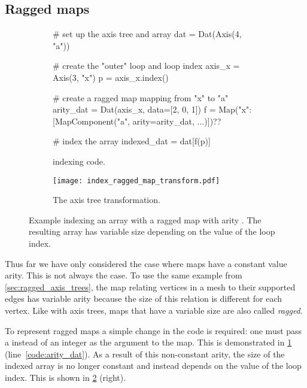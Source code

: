 \documentclass[thesis]{subfiles}
\begin{document}
\subsection{Ragged maps}
\label{sec:indexing_ragged_maps}

\begin{figure}
  \centering

  \begin{subfigure}{.9\textwidth}
    \begin{pyalg2}
      # set up the axis tree and array
      dat = Dat(Axis(4, "a"))

      # create the "outer" loop and loop index
      axis_x = Axis(3, "x")
      p = axis_x.index()

      # create a ragged map mapping from "x" to "a"
      arity_dat = Dat(axis_x, data=[2, 0, 1])
      f = Map({"x": [MapComponent("a", arity=arity_dat, ...)]})?\label{code:arity_dat}?

      # index the array
      indexed_dat = dat[f(p)]
    \end{pyalg2}

    \caption{ indexing code.}
    \label{fig:index_ragged_map_code}
  \end{subfigure}

  \vspace{1em}

  \begin{subfigure}{\textwidth}
    \centering
    \texttt{[image: index\_ragged\_map\_transform.pdf]}
    \caption{The axis tree transformation.}
    \label{fig:index_ragged_map_transform}
  \end{subfigure}

  \caption{
    Example indexing an array with a ragged map with arity \pycode{[2, 0, 1]}.
    The resulting array has variable size depending on the value of the loop index.
  }
  \label{fig:index_ragged_map}
\end{figure}

Thus far we have only considered the case where maps have a constant value arity.
This is not always the case.
To use the same example from \cref{sec:ragged_axis_trees}, the map relating vertices in a mesh to their supported edges has variable arity because the size of this relation is different for each vertex.
Like with axis trees, maps that have a variable size are also called \emph{ragged}.

To represent ragged maps a simple change in the code is required: one must pass a  instead of an integer as the  argument to the map.
This is demonstrated in \cref{fig:index_ragged_map_code} (line~\ref{code:arity_dat}).
As a result of this non-constant arity, the size of the indexed array is no longer constant and instead depends on the value of the loop index.
This is shown in \cref{fig:index_ragged_map_transform} (right).
\end{document}
